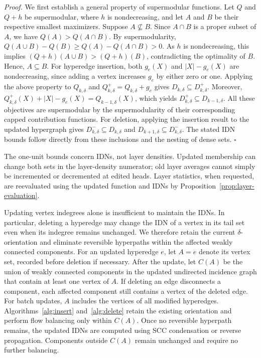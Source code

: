 \documentclass[twocolumn]{svjour3}
\begin{document}
\emph{Proof.}
We first establish a general property of supermodular functions. Let $Q$ and $Q+h$ be supermodular, where $h$ is nondecreasing, and let $A$ and $B$ be their respective smallest maximizers. Suppose $A\not\subseteq B$. Since $A\cap B$ is a proper subset of $A$, we have $Q(A)>Q(A\cap B)$. By supermodularity,
$Q(A\cup B)-Q(B)
\ge Q(A)-Q(A\cap B)>0$.
As $h$ is nondecreasing, this implies
$(Q+h)(A\cup B)>(Q+h)(B)$, contradicting the optimality of $B$. Hence, $A\subseteq B$.
For hyperedge insertion, both $g_e(X)$ and $|X|-g_e(X)$ are nondecreasing, since adding a vertex increases $g_e$ by either zero or one. Applying the above property to $Q_{k,\delta}$ and $Q^+_{k,\delta}=Q_{k,\delta}+g_e$ gives
$D_{k,\delta}\subseteq D^+_{k,\delta}$.
Moreover,
$Q^+_{k,\delta}(X)+|X|-g_e(X)
=Q_{k-1,\delta}(X)$,
which yields $D^+_{k,\delta}\subseteq D_{k-1,\delta}$.
All these objectives are supermodular by the supermodularity of their corresponding capped contribution functions.
For deletion, applying the insertion result to the updated hypergraph gives
$D^-_{k,\delta}\subseteq D_{k,\delta}$ and
$D_{k+1,\delta}\subseteq D^-_{k,\delta}$.
The stated IDN bounds follow directly from these inclusions and the nesting of dense sets.
\hfill$\square$

The one-unit bounds concern IDNs, not layer densities. Updated membership can change both sets in the layer-density numerator; old layer averages cannot simply be incremented or decremented at edited heads. Layer statistics, when requested, are reevaluated using the updated function and IDNs by Proposition~\ref{prop:layer-evaluation}.

Updating vertex indegrees alone is insufficient to maintain the IDNs. In particular, deleting a hyperedge may change the IDN of a vertex in its tail set even when its indegree remains unchanged. We therefore retain the current $\delta$-orientation and eliminate reversible hyperpaths within the affected weakly connected components.
For an updated hyperedge $e$, let $A=e$ denote its vertex set, recorded before deletion if necessary. After the update, let $C(A)$ be the union of weakly connected components in the updated undirected incidence graph that contain at least one vertex of $A$. If deleting an edge disconnects a component, each affected component still contains a vertex of the deleted edge. For batch updates, $A$ includes the vertices of all modified hyperedges.
Algorithms~\ref{alg:insert} and~\ref{alg:delete} retain the existing orientation and perform flow balancing only within $C(A)$. Once no reversible hyperpath remains, the updated IDNs are computed using SCC condensation or reverse propagation. Components outside $C(A)$ remain unchanged and require no further balancing.
\end{document}
